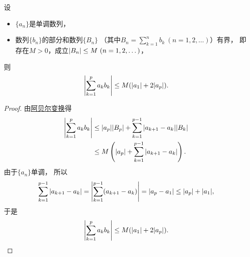 \begin{lemma}[阿贝尔引理]\label{theorem:无穷级数.阿贝尔引理}
设\begin{itemize}
	\item \(\{a_n\}\)是单调数列，
	\item 数列\(\{b_n\}\)的部分和数列\(\{B_n\}\)
	（其中\(B_n = \sum_{k=1}^n b_k\ (n=1,2,\dotsc)\)）有界，
	即存在\(M>0\)，成立\(\abs{B_n} \leq M\ (n=1,2,\dotsc)\)，
\end{itemize}
则\begin{equation*}
	\abs{\sum_{k=1}^p a_k b_k}
	\leq M(\abs{a_1} + 2 \abs{a_p}).
\end{equation*}
\begin{proof}
由\hyperref[equation:无穷级数.阿贝尔的分部求和公式]{阿贝尔变换}得\begin{align*}
	\abs{\sum_{k=1}^p a_k b_k}
	&\leq \abs{a_p} \abs{B_p} + \sum_{k=1}^{p-1} \abs{a_{k+1} - a_k} \abs{B_k} \\
	&\leq M \left(
		\abs{a_p}
		+ \sum_{k=1}^{p-1} \abs{a_{k+1} - a_k}
	\right).
\end{align*}
由于\(\{a_n\}\)单调，
所以\begin{equation*}
	\sum_{k=1}^{p-1} \abs{a_{k+1} - a_k}
	= \abs{\sum_{k=1}^{p-1} (a_{k+1} - a_k)}
	= \abs{a_p - a_1}
	\leq \abs{a_p} + \abs{a_1},
\end{equation*}
于是\begin{equation*}
	\abs{\sum_{k=1}^p a_k b_k}
	\leq M(\abs{a_1} + 2 \abs{a_p}).
	\qedhere
\end{equation*}
\end{proof}
\end{lemma}

